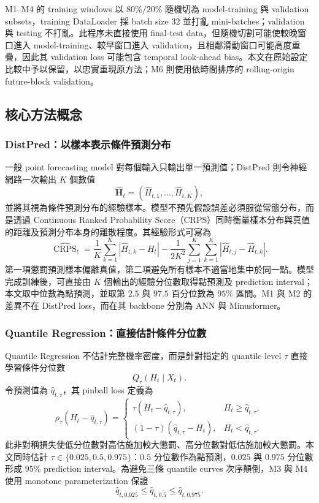 M1--M4 的 training windows 以 $80\%/20\%$ 隨機切為 model-training 與 validation subsets，training DataLoader 採 batch size $32$ 並打亂 mini-batches；validation 與 testing 不打亂。此程序未直接使用 final-test data，但隨機切割可能使較晚窗口進入 model-training、較早窗口進入 validation，且相鄰滑動窗口可能高度重疊，因此其 validation loss 可能包含 temporal look-ahead bias。本文在原始設定比較中予以保留，以忠實重現原方法；M6 則使用依時間排序的 rolling-origin future-block validation。

\subsection{核心方法概念}
\label{subsec:core-method-concepts}

\subsubsection{DistPred：以樣本表示條件預測分布}

一般 point forecasting model 對每個輸入只輸出單一預測值；DistPred 則令神經網路一次輸出 $K$ 個數值
\[
    \widehat{\boldsymbol H}_t
    =(\widehat H_{t,1},\ldots,\widehat H_{t,K}),
\]
並將其視為條件預測分布的經驗樣本。模型不預先假設誤差必須服從常態分布，而是透過 Continuous Ranked Probability Score（CRPS）同時衡量樣本分布與真值的距離及預測分布本身的離散程度。其經驗形式可寫為
\[
    \widehat{\operatorname{CRPS}}_t
    =\frac{1}{K}\sum_{k=1}^{K}
      |\widehat H_{t,k}-H_t|
    -\frac{1}{2K^2}\sum_{j=1}^{K}\sum_{k=1}^{K}
      |\widehat H_{t,j}-\widehat H_{t,k}|.
\]
第一項懲罰預測樣本偏離真值，第二項避免所有樣本不適當地集中於同一點。模型完成訓練後，可直接由 $K$ 個輸出的經驗分位數取得點預測及 prediction interval；本文取中位數為點預測，並取第 $2.5$ 與 $97.5$ 百分位數為 $95\%$ 區間。M1 與 M2 的差異不在 DistPred loss，而在其 backbone 分別為 ANN 與 Minusformer。

\subsubsection{Quantile Regression：直接估計條件分位數}

Quantile Regression 不估計完整機率密度，而是針對指定的 quantile level $\tau$ 直接學習條件分位數
\[
    Q_{\tau}(H_t\mid X_t).
\]
令預測值為 $\widehat q_{t,\tau}$，其 pinball loss 定義為
\[
    \rho_{\tau}(H_t-\widehat q_{t,\tau})
    =
    \begin{cases}
      \tau(H_t-\widehat q_{t,\tau}),
      & H_t\geq \widehat q_{t,\tau},\\
      (1-\tau)(\widehat q_{t,\tau}-H_t),
      & H_t<\widehat q_{t,\tau}.
    \end{cases}
\]
此非對稱損失使低分位數對高估施加較大懲罰、高分位數對低估施加較大懲罰。本文同時估計 $\tau\in\{0.025,0.5,0.975\}$：$0.5$ 分位數作為點預測，$0.025$ 與 $0.975$ 分位數形成 $95\%$ prediction interval。為避免三條 quantile curves 次序顛倒，M3 與 M4 使用 monotone parameterization 保證
\[
    \widehat q_{t,0.025}
    \leq \widehat q_{t,0.5}
    \leq \widehat q_{t,0.975}.
\]

